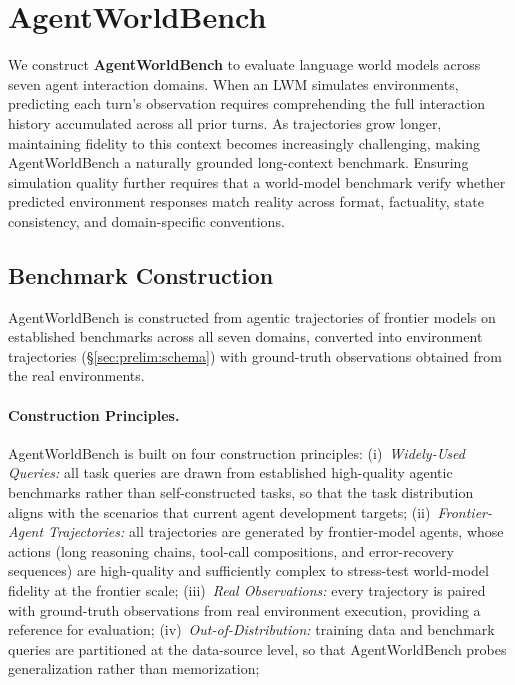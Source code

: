 \documentclass{llmxive}
\providecommand{\bench}{AgentWorldBench\xspace}
\begin{document}
\section{\bench}
\label{sec:bench}

We construct \textbf{\bench} to evaluate language world models across seven agent interaction domains.
When an LWM simulates environments, predicting each turn's observation requires comprehending the full interaction history accumulated across all prior turns.
As trajectories grow longer, maintaining fidelity to this context becomes increasingly challenging, making \bench a naturally grounded long-context benchmark.
Ensuring simulation quality further requires that a world-model benchmark verify whether predicted environment responses match reality across format, factuality, state consistency, and domain-specific conventions.

\subsection{Benchmark Construction}
\label{sec:bench:construction}

\bench is constructed from agentic trajectories of frontier models on established benchmarks across all seven domains, converted into environment trajectories (\S\ref{sec:prelim:schema}) with ground-truth observations obtained from the real environments.


\paragraph{Construction Principles.}
\bench is built on four construction principles:
(i)~\emph{Widely-Used Queries:} all task queries are drawn from established high-quality agentic benchmarks rather than self-constructed tasks, so that the task distribution aligns with the scenarios that current agent development targets;
(ii)~\emph{Frontier-Agent Trajectories:} all trajectories are generated by frontier-model agents, whose actions (long reasoning chains, tool-call compositions, and error-recovery sequences) are high-quality and sufficiently complex to stress-test world-model fidelity at the frontier scale;
(iii)~\emph{Real Observations:} every trajectory is paired with ground-truth observations from real environment execution, providing a reference for evaluation;
(iv)~\emph{Out-of-Distribution:} training data and benchmark queries are partitioned at the data-source level, so that \bench probes generalization rather than memorization;
\end{document}
